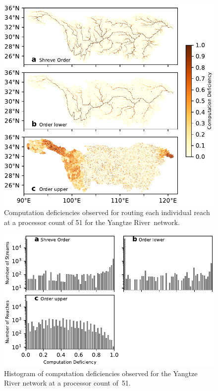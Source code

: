 \documentclass[water,article,accept,pdftex,moreauthors]{Definitions/mdpi}
\begin{document}
\begin{figure}[H]
    \includegraphics[width=11.5cm]{fig/computation_deficiency_yangtze.pdf}
    \caption{Computation deficiencies observed for routing each individual reach at a processor count of 51 for the Yangtze River~network. \label{fig:computation_deficiency_yangtze}}
\end{figure}
\unskip

\begin{figure}[H]
    \includegraphics[width=13.5cm]{fig/computation_cost_hist_yangtze.pdf}
    \caption{Histogram of computation deficiencies observed for the Yangtze River network at a processor count of~51. \label{fig:computation_deficiency_hist_yangtze}}
\end{figure}
\unskip
\end{document}
